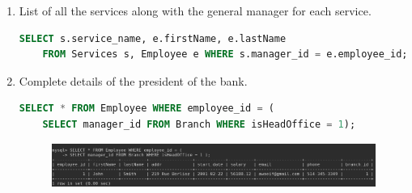 \documentclass[letterpaper, 12pt]{article}
\begin{document}
\begin{enumerate}[label=\arabic*.]
\begin{lstlisting}[language=sql]
  \end{lstlisting}
  \item List of all the services along with the general manager for each service.
    \begin{lstlisting}[language=sql]
SELECT s.service_name, e.firstName, e.lastName 
	FROM Services s, Employee e WHERE s.manager_id = e.employee_id;
  \end{lstlisting}
  \item Complete details of the president of the bank.
    \begin{lstlisting}[language=sql]
SELECT * FROM Employee WHERE employee_id = (
	SELECT manager_id FROM Branch WHERE isHeadOffice = 1);
  \end{lstlisting}
\begin{figure}[H]
  \centering
  \includegraphics[scale=0.55]{images/query_10.png}
\end{figure}

\end{enumerate}
\end{document}
